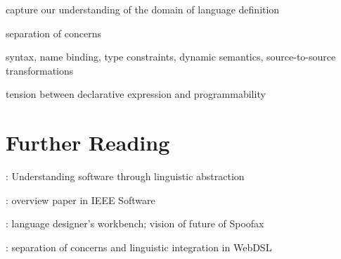 capture our understanding of the domain of language definition

separation of concerns

syntax, name binding, type constraints, dynamic semantics, source-to-source
transformations


tension between declarative expression and programmability

\section{Further Reading}

\cite{Visser15}: Understanding software through linguistic abstraction

\cite{WachsmuthKV14}: overview paper in IEEE Software

\cite{VisserOnward14}: language designer's workbench; vision of future of
Spoofax

\cite{GroenewegenHV10}: separation of concerns and linguistic integration in
WebDSL \cite{Visser07}


